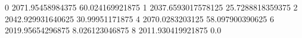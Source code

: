 0 2071.95458984375 60.024169921875
1 2037.6593017578125 25.7288818359375
2 2042.929931640625 30.99951171875
4 2070.0283203125 58.097900390625
6 2019.95654296875 8.026123046875
8 2011.930419921875 0.0
